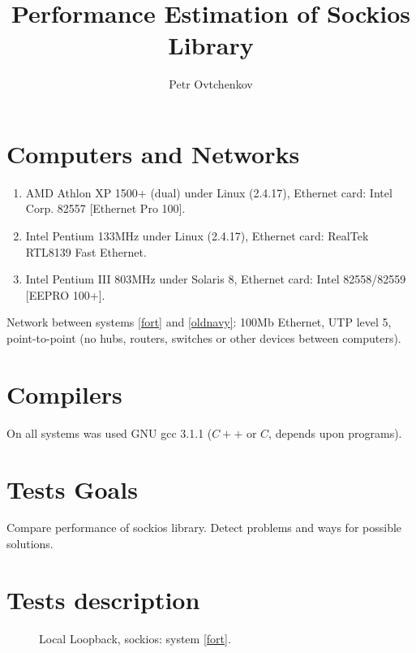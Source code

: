 \documentclass[a4paper]{article}
\title{Performance Estimation of Sockios Library}
\author{Petr Ovtchenkov}
\begin{document}
\maketitle

\section{Computers and Networks}

\begin{enumerate}
  \item AMD Athlon XP 1500+ (dual) under Linux (2.4.17),
        Ethernet card: Intel Corp. 82557 [Ethernet Pro 100].\label{fort}
  \item Intel Pentium 133MHz under Linux (2.4.17),
        Ethernet card: RealTek RTL8139 Fast Ethernet.\label{oldnavy}
  \item Intel Pentium III 803MHz under Solaris 8,
        Ethernet card: Intel 82558/82559 [EEPRO 100+].\label{ermine}
\end{enumerate}

Network between systems \ref{fort} and \ref{oldnavy}: 100Mb Ethernet,
UTP level 5, point-to-point (no hubs, routers,
switches or other devices between computers).

\section{Compilers}

On all systems was used GNU gcc 3{.}1{.}1 ($C{+}{+}$ or $C$, depends
upon programs).

\section{Tests Goals}

Compare performance of sockios library. Detect problems and ways for
possible solutions.

\section{Tests description}

\begin{figure}
  \begin{center}
  \end{center}
  \caption{Local Loopback, sockios: system \ref{fort}.}
\end{figure}
\end{document}
